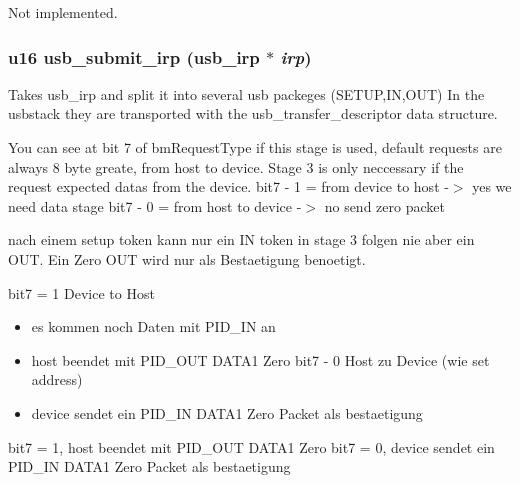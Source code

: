 Not implemented. 
\subsubsection{\setlength{\rightskip}{0pt plus 5cm}u16 usb\_\-submit\_\-irp ({\bf usb\_\-irp} $\ast$ {\em irp})}\label{core_8c_265cc39d7b493019e5681b27a4349183}


Takes usb\_\-irp and split it into several usb packeges (SETUP,IN,OUT) In the usbstack they are transported with the usb\_\-transfer\_\-descriptor data structure. 

You can see at bit 7 of bm\-Request\-Type if this stage is used, default requests are always 8 byte greate, from host to device. Stage 3 is only neccessary if the request expected datas from the device. bit7 - 1 = from device to host -$>$ yes we need data stage bit7 - 0 = from host to device -$>$ no send zero packet

nach einem setup token kann nur ein IN token in stage 3 folgen nie aber ein OUT. Ein Zero OUT wird nur als Bestaetigung benoetigt.

bit7 = 1 Device to Host\begin{itemize}
\item es kommen noch Daten mit PID\_\-IN an\item host beendet mit PID\_\-OUT DATA1 Zero bit7 - 0 Host zu Device (wie set address)\item device sendet ein PID\_\-IN DATA1 Zero Packet als bestaetigung\end{itemize}


bit7 = 1, host beendet mit PID\_\-OUT DATA1 Zero bit7 = 0, device sendet ein PID\_\-IN DATA1 Zero Packet als bestaetigung 